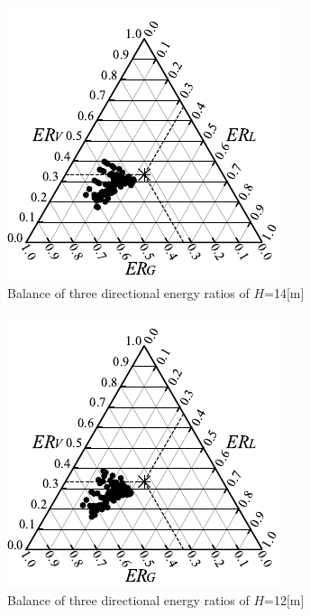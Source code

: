 \begin{figure}[H]
    \centering
    \includegraphics[keepaspectratio,scale=1.2]{05_att/reflect/rec_Ternary_out_14m.pdf}
    \caption{\hspace{1mm}Balance of three directional energy ratios of $H$=14[m]}
    \label{fig:sankaku14_r}
\end{figure}

\begin{figure}[H]
    \centering
    \includegraphics[keepaspectratio,scale=1.2]{05_att/reflect/rec_Ternary_out_12m.pdf}
    \caption{\hspace{1mm}Balance of three directional energy ratios of $H$=12[m]}
    \label{fig:sankaku12_r}
\end{figure}


